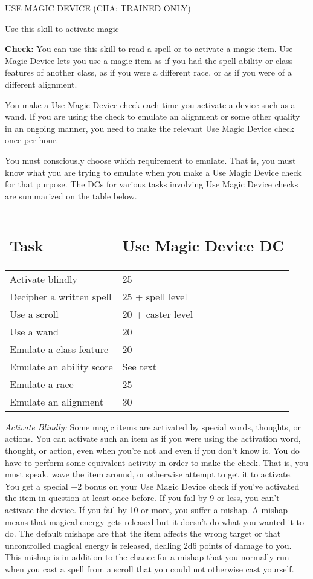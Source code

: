 \documentclass{article}
\begin{document}
\vspace{12pt}
USE MAGIC DEVICE (CHA; TRAINED ONLY)

Use this skill to activate magic

\textbf{Check:} You can use this skill to read a spell or to activate a magic item. 
Use Magic Device lets you use a magic item as if you had the spell ability or class 
features of another class, as if you were a different race, or as if you were of 
a different alignment.

You make a Use Magic Device check each time you activate a device such as a wand. 
If you are using the check to emulate an alignment or some other quality in an 
ongoing manner, you need to make the relevant Use Magic Device check once per hour.

You must consciously choose which requirement to emulate. That is, you must know 
what you are trying to emulate when you make a Use Magic Device check for that 
purpose. The DCs for various tasks involving Use Magic Device checks are summarized 
on the table below.

\vspace{12pt}
\begin{tabular}{|>{\raggedright}p{95pt}|>{\raggedright}p{91pt}|}
\hline
\subsection*{T\textbf{ask }} & \subsection*{U\textbf{se Magic Device DC}}\tabularnewline
\hline
Activate blindly  & 25\tabularnewline
\hline
Decipher a written spell  & 25 + spell level\tabularnewline
\hline
Use a scroll  & 20 + caster level\tabularnewline
\hline
Use a wand  & 20\tabularnewline
\hline
Emulate a class feature  & 20\tabularnewline
\hline
Emulate an ability score  & See text\tabularnewline
\hline
Emulate a race  & 25\tabularnewline
\hline
Emulate an alignment  & 30\tabularnewline
\hline
\end{tabular}

\vspace{12pt}
\textit{Activate Blindly: }Some magic items are activated by special words, thoughts, 
or actions. You can activate such an item as if you were using the activation word, 
thought, or action, even when you're not and even if you don't know it. You do 
have to perform some equivalent activity in order to make the check. That is, you 
must speak, wave the item around, or otherwise attempt to get it to activate. You 
get a special +2 bonus on your Use Magic Device check if you've activated the item 
in question at least once before. If you fail by 9 or less, you can't activate 
the device. If you fail by 10 or more, you suffer a mishap. A mishap means that 
magical energy gets released but it doesn't do what you wanted it to do. The default 
mishaps are that the item affects the wrong target or that uncontrolled magical 
energy is released, dealing 2d6 points of damage to you. This mishap is in addition 
to the chance for a mishap that you normally run when you cast a spell from a scroll 
that you could not otherwise cast yourself.
\end{document}
